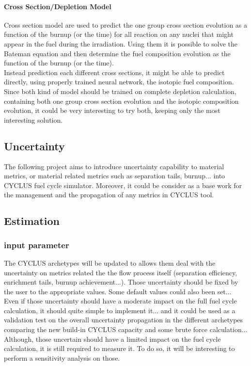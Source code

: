 \documentclass[dvips,12pt]{article}
\begin{document}
\paragraph{Cross Section/Depletion Model\\}
Cross section model are used to predict the one group cross section evolution as a function of the burnup (or the time) for all reaction on any nuclei that might appear in the fuel during the irradiation.
Using them it is possible to solve the Bateman equation and then determine the fuel composition evolution as the function of the burnup (or the time).\\
Instead prediction each different cross sections, it might be able to predict directly, using properly trained neural network, the isotopic fuel composition.\\
Since both kind of model should be trained on complete depletion calculation, containing both one group cross section evolution and the isotopic composition evolution, it could be very interesting to try both, keeping only the most interesting solution.



\subsection{Uncertainty}
The following project aims to introduce uncertainty capability to material metrics, or material related metrics such as separation tails, burnup...  into CYCLUS fuel cycle simulator. Moreover, it could be consider as a base work for the management and the propagation of any metrics in CYCLUS tool.




\subsection{Estimation}
\subsubsection{input parameter}
The CYCLUS archetypes will be updated to allows them deal with the uncertainty on metrics related the the flow process itself (separation efficiency, enrichment tails, burnup achievement...). Those uncertainty should be fixed by the user to the appropriate values. Some default values could also been set...\\
Even if those uncertainty should have a moderate impact on the full fuel cycle calculation, it should quite simple to implement it... and it could be used as a validation test on the overall uncertainty propagation in the different archetypes comparing the new build-in CYCLUS capacity and some brute force calculation...\\
Although, those uncertain should have a limited impact on the fuel cycle calculation, it is still required to measure it. To do so, it will be interesting to perform a sensitivity analysis on those.
\end{document}

